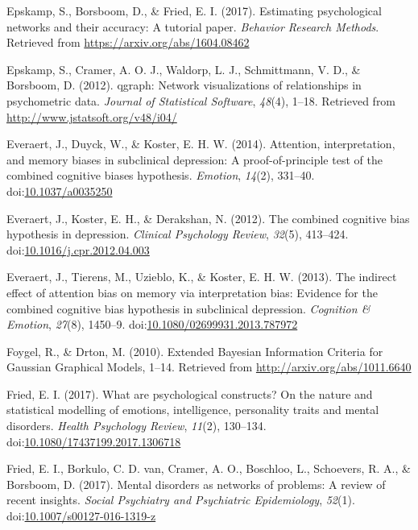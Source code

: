 \documentclass[man,floatsintext]{apa6}
\begin{document}
\leavevmode\hypertarget{ref-R-bootnet}{}%
Epskamp, S., Borsboom, D., \& Fried, E. I. (2017). Estimating psychological networks and their accuracy: A tutorial paper. \emph{Behavior Research Methods}. Retrieved from \url{https://arxiv.org/abs/1604.08462}

\leavevmode\hypertarget{ref-R-qgraph}{}%
Epskamp, S., Cramer, A. O. J., Waldorp, L. J., Schmittmann, V. D., \& Borsboom, D. (2012). qgraph: Network visualizations of relationships in psychometric data. \emph{Journal of Statistical Software}, \emph{48}(4), 1--18. Retrieved from \url{http://www.jstatsoft.org/v48/i04/}

\leavevmode\hypertarget{ref-Everaert2014}{}%
Everaert, J., Duyck, W., \& Koster, E. H. W. (2014). Attention, interpretation, and memory biases in subclinical depression: A proof-of-principle test of the combined cognitive biases hypothesis. \emph{Emotion}, \emph{14}(2), 331--40. doi:\href{https://doi.org/10.1037/a0035250}{10.1037/a0035250}

\leavevmode\hypertarget{ref-everaert_combined_2012}{}%
Everaert, J., Koster, E. H., \& Derakshan, N. (2012). The combined cognitive bias hypothesis in depression. \emph{Clinical Psychology Review}, \emph{32}(5), 413--424. doi:\href{https://doi.org/10.1016/j.cpr.2012.04.003}{10.1016/j.cpr.2012.04.003}

\leavevmode\hypertarget{ref-Everaert2013}{}%
Everaert, J., Tierens, M., Uzieblo, K., \& Koster, E. H. W. (2013). The indirect effect of attention bias on memory via interpretation bias: Evidence for the combined cognitive bias hypothesis in subclinical depression. \emph{Cognition \& Emotion}, \emph{27}(8), 1450--9. doi:\href{https://doi.org/10.1080/02699931.2013.787972}{10.1080/02699931.2013.787972}

\leavevmode\hypertarget{ref-foygel_extended_2010}{}%
Foygel, R., \& Drton, M. (2010). Extended Bayesian Information Criteria for Gaussian Graphical Models, 1--14. Retrieved from \url{http://arxiv.org/abs/1011.6640}

\leavevmode\hypertarget{ref-fried_what_2017}{}%
Fried, E. I. (2017). What are psychological constructs? On the nature and statistical modelling of emotions, intelligence, personality traits and mental disorders. \emph{Health Psychology Review}, \emph{11}(2), 130--134. doi:\href{https://doi.org/10.1080/17437199.2017.1306718}{10.1080/17437199.2017.1306718}

\leavevmode\hypertarget{ref-fried_mental_2017}{}%
Fried, E. I., Borkulo, C. D. van, Cramer, A. O., Boschloo, L., Schoevers, R. A., \& Borsboom, D. (2017). Mental disorders as networks of problems: A review of recent insights. \emph{Social Psychiatry and Psychiatric Epidemiology}, \emph{52}(1). doi:\href{https://doi.org/10.1007/s00127-016-1319-z}{10.1007/s00127-016-1319-z}
\end{document}
